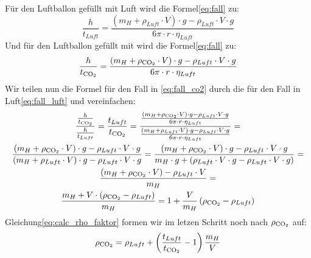 \documentclass{article}
\begin{document}
    Für den Luftballon gefüllt mit Luft wird die Formel\ref{eq:fall} zu:
    \begin{equation} \label{eq:fall_luft}
        \frac{h}{t_{Luft}} = \frac{ \left( m_H + \rho_{Luft} \cdot V \right) \cdot g - \rho_{Luft} \cdot V \cdot g }{ 6 \pi \cdot r \cdot \eta_{Luft} }
    \end{equation}
    Und für den Luftballon gefüllt mit  wird die Formel\ref{eq:fall} zu:
    \begin{equation} \label{eq:fall_co2}
        \frac{h}{t_{\ce{CO2}}} = \frac{ \left( m_H + \rho_{\ce{CO2}} \cdot V \right) \cdot g - \rho_{Luft} \cdot V \cdot g }{ 6 \pi \cdot r \cdot \eta_{Luft} }
    \end{equation}
    Wir teilen nun die Formel für den Fall in \ref{eq:fall_co2} durch die für den Fall in Luft\ref{eq:fall_luft} und vereinfachen:
    \begin{equation} \label{eq:calc_rho_faktor}
        \begin{gathered}
            \frac{ \frac{h}{t_{\ce{CO2}}} }{ \frac{h}{t_{Luft}} } = \frac{ t_{Luft} }{ t_{\ce{CO2}} } =
            \frac{ \frac{ \left( m_H + \rho_{\ce{CO2}} \cdot V \right) \cdot g - \rho_{Luft} \cdot V \cdot g }{ 6 \pi \cdot r \cdot \eta_{Luft} } }
                 { \frac{ \left( m_H + \rho_{Luft} \cdot V \right) \cdot g - \rho_{Luft} \cdot V \cdot g }{ 6 \pi \cdot r \cdot \eta_{Luft} } } = \\
            \frac{ \left( m_H + \rho_{\ce{CO2}} \cdot V \right) \cdot g - \rho_{Luft} \cdot V \cdot g }{ \left( m_H + \rho_{Luft} \cdot V \right) \cdot g - \rho_{Luft} \cdot V \cdot g } =
            \frac{ \left( m_H + \rho_{\ce{CO2}} \cdot V \right) \cdot g - \rho_{Luft} \cdot V \cdot g }{ m_H \cdot g + \left( \rho_{Luft} \cdot V \cdot g - \rho_{Luft} \cdot V \cdot g \right) } = \\
            \frac{ \left( m_H + \rho_{\ce{CO2}} \cdot V \right) - \rho_{Luft} \cdot V }{ m_H } = \\
            \frac{ m_H + V \cdot \left( \rho_{\ce{CO2}} - \rho_{Luft} \right)}{ m_H } = 1 + \frac{V}{m_H} \left( \rho_{\ce{CO2}} - \rho_{Luft} \right)
        \end{gathered}
    \end{equation} 
    Gleichung\ref{eq:calc_rho_faktor} formen wir im letzen Schritt noch nach \(\rho_{\ce{CO2}}\) auf:
    \begin{equation} \label{eq:calc_rho_co2}
        \rho_{\ce{CO2}} = \rho_{Luft} + \left( \frac{t_{Luft}}{t_{\ce{CO2}}} - 1 \right) \frac{m_H}{V}
    \end{equation}
\end{document}
